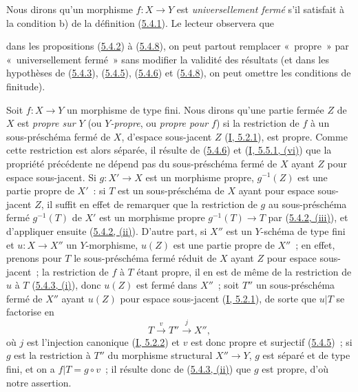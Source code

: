 \begin{remark}[5.4.9]
\label{II.5.4.9-fr}
Nous dirons qu'un morphisme $f:X\to Y$ est \emph{universellement fermé} s'il
satisfait à la condition b) de la définition
(\hyperref[II.5.4.1-fr]{5.4.1}). Le lecteur observera que


dans les propositions (\hyperref[II.5.4.2-fr]{5.4.2}) à
(\hyperref[II.5.4.8-fr]{5.4.8}), on peut partout remplacer «~propre~» par
«~universellement fermé~» sans modifier la validité des résultats (et dans
les hypothèses de (\hyperref[II.5.4.3-fr]{5.4.3}),
(\hyperref[II.5.4.5-fr]{5.4.5}), (\hyperref[II.5.4.6-fr]{5.4.6}) et
(\hyperref[II.5.4.8-fr]{5.4.8}), on peut omettre les conditions de
finitude).
\end{remark}

\begin{env}[5.4.10]
\label{II.5.4.10-fr}
Soit $f:X\to Y$ un morphisme de type fini. Nous dirons qu'une partie fermée
$Z$ de $X$ est \emph{propre sur $Y$} (ou \emph{$Y$-propre}, ou \emph{propre
pour $f$}) si la restriction de $f$ à un sous-préschéma fermé de $X$,
d'espace sous-jacent $Z$ (\hyperref[I.5.2.1-fr]{I, 5.2.1}), est propre.
Comme cette restriction est alors séparée, il résulte de
(\hyperref[II.5.4.6-fr]{5.4.6}) et (\hyperref[I.5.5.1-fr]{I, 5.5.1, (vi)})
que la propriété précédente ne dépend pas du sous-préschéma fermé de $X$
ayant $Z$ pour espace sous-jacent. Si $g:X'\to X$ est un morphisme propre,
$g^{-1}(Z)$ est une partie propre de $X'$~: si $T$ est un sous-préschéma de
$X$ ayant pour espace sous-jacent $Z$, il suffit en effet de remarquer que
la restriction de $g$ au sous-préschéma fermé $g^{-1}(T)$ de $X'$ est un
morphisme propre $g^{-1}(T)\to T$ par
(\hyperref[II.5.4.2-fr]{5.4.2, (iii)}), et d'appliquer ensuite
(\hyperref[II.5.4.2-fr]{5.4.2, (ii)}). D'autre part, si $X''$ est un
$Y$-schéma de type fini et $u:X\to X''$ un $Y$-morphisme, $u(Z)$ est une
partie propre de $X''$~; en effet, prenons pour $T$ le sous-préschéma fermé
réduit de $X$ ayant $Z$ pour espace sous-jacent~; la restriction de $f$ à
$T$ étant propre, il en est de même de la restriction de $u$ à $T$
(\hyperref[II.5.4.3-fr]{5.4.3, (i)}), donc $u(Z)$ est fermé dans $X''$~;
soit $T''$ un sous-préschéma fermé de $X''$ ayant $u(Z)$ pour espace
sous-jacent (\hyperref[I.5.2.1-fr]{I, 5.2.1}), de sorte que $u|T$ se
factorise en
\[
  T\xrightarrow{v}T''\xrightarrow{j}X'',
\]
où $j$ est l'injection canonique (\hyperref[I.5.2.2-fr]{I, 5.2.2}) et $v$
est donc propre et surjectif (\hyperref[II.5.4.5-fr]{5.4.5})~; si $g$ est la
restriction à $T''$ du morphisme structural $X''\to Y$, $g$ est séparé et
de type fini, et on a $f|T=g\circ v$~; il résulte donc de
(\hyperref[II.5.4.3-fr]{5.4.3, (ii)}) que $g$ est propre, d'où notre
assertion.
\end{env}


